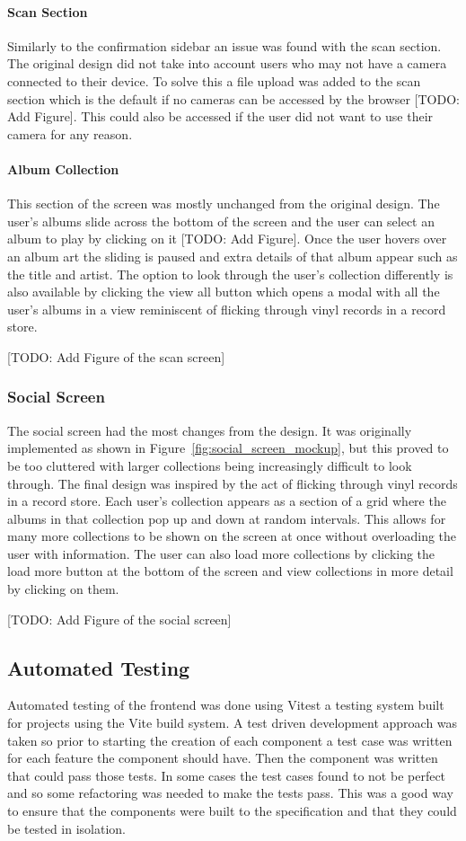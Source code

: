 \paragraph{Scan Section}
Similarly to the confirmation sidebar an issue was found with the scan section. The original design did not take into account users who may not have a camera connected to their device. To solve this a file upload was added to the scan section which is the default if no cameras can be accessed by the browser [TODO: Add Figure]. This could also be accessed if the user did not want to use their camera for any reason.

\paragraph{Album Collection}
This section of the screen was mostly unchanged from the original design. The user's albums slide across the bottom of the screen and the user can select an album to play by clicking on it [TODO: Add Figure]. Once the user hovers over an album art the sliding is paused and extra details of that album appear such as the title and artist. The option to look through the user's collection differently is also available by clicking the view all button which opens a modal with all the user's albums in a view reminiscent of flicking through vinyl records in a record store.

[TODO: Add Figure of the scan screen]

\subsubsection{Social Screen}
The social screen had the most changes from the design. It was originally implemented as shown in Figure~\ref{fig:social_screen_mockup}, but this proved to be too cluttered with larger collections being increasingly difficult to look through. The final design was inspired by the act of flicking through vinyl records in a record store. Each user's collection appears as a section of a grid where the albums in that collection pop up and down at random intervals. This allows for many more collections to be shown on the screen at once without overloading the user with information. The user can also load more collections by clicking the load more button at the bottom of the screen and view collections in more detail by clicking on them.

[TODO: Add Figure of the social screen]

\subsection{Automated Testing}
Automated testing of the frontend was done using Vitest a testing system built for projects using the Vite build system. A test driven development approach was taken so prior to starting the creation of each component a test case was written for each feature the component should have. Then the component was written that could pass those tests. In some cases the test cases found to not be perfect and so some refactoring was needed to make the tests pass. This was a good way to ensure that the components were built to the specification and that they could be tested in isolation.


